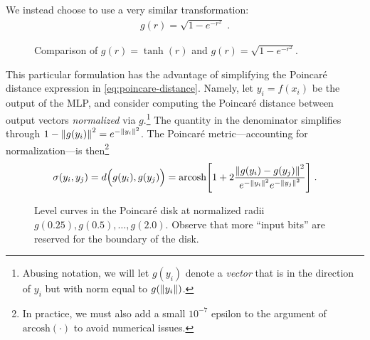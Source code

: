 \documentclass{article}
\begin{document}
We instead choose to use a very similar transformation:
\begin{align}
  g(r) = \sqrt{1 - e^{-r^2}} \; . \label{eq:radial-transformation}
\end{align}

\begin{figure}[ht]
  \centering
  \caption{Comparison of $g(r) = \tanh(r)$ and $g(r) = \sqrt{1 - e^{-r^2}}$.}
  \label{fig:radial-transformations}
\end{figure}

This particular formulation has the advantage of simplifying the Poincaré distance expression in \eqref{eq:poincare-distance}. Namely, let $y_i = f(x_i)$ be the output of the MLP, and consider computing the Poincaré distance between output vectors \emph{normalized} via $g$.\footnote{Abusing notation, we will let $g(y_i)$ denote a \emph{vector} that is in the direction of $y_i$ but with norm equal to $g(\norm{y_i})$.} The quantity in the denominator simplifies through $1 - \norm{g(y_i)}^2 = e^{-\norm{y_i}^2}$. The Poincaré metric---accounting for normalization---is then\footnote{In practice, we must also add a small $10^{-7}$ epsilon to the argument of $\text{arcosh}(\cdot)$ to avoid numerical issues.}
\begin{align}
  \sigma(y_i, y_j)
  = d \Big( g(y_i), g(y_j) \Big)
  = \text{arcosh} \qty[1 + 2 \frac{\norm{g(y_i) - g(y_j)}^2}{e^{-\norm{y_i}^2} e^{-\norm{y_j}^2}}] \; .
\end{align}

\begin{figure}[ht]
  \centering
  \caption{Level curves in the Poincaré disk at normalized radii $g(0.25), g(0.5), \dots, g(2.0)$. Observe that more ``input bits'' are reserved for the boundary of the disk.}
  \label{fig:poincare-level-curves}
\end{figure}
\end{document}
